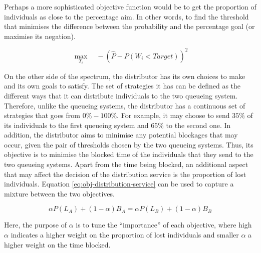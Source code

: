 Perhaps a more sophisticated objective function would be to get the proportion 
of individuals as close to the percentage aim. 
In other words, to find the threshold that minimises the difference between the 
probability and the percentage goal (or maximise its negation).

\begin{equation}
    \max_{T_i} \quad -\left( \hat{P} - P(W_i < \textit{Target}) \right)^2
\end{equation}


On the other side of the spectrum, the distributor has its own choices 
to make and its own goals to satisfy.
The set of strategies it has can be defined as the different ways that it can 
distribute individuals to the two queueing system.
Therefore, unlike the queueing systems, the distributor has a 
continuous set of strategies that goes from \( 0\% - 100\% \). 
For example, it may choose to send \(35\%\) of its individuals to the first 
queueing system and \(65\%\) to the second one.
In addition, the distributor aims to minimise any potential blockages
that may occur, given the pair of thresholds chosen by the two queueing systems.
Thus, its objective is to minimise the blocked time of the individuals 
that they send to the two queueing systems.
Apart from the time being blocked, an additional aspect that may affect the 
decision of the distribution service is the proportion of lost individuals.
Equation \ref{eq:obj-distribution-service} can be used to capture a mixture 
between the two objectives.

\begin{equation}\label{eq:obj-distribution-service}
    \alpha P(L_A) + (1 - \alpha) B_A = 
    \alpha P(L_B) + (1 - \alpha) B_B
\end{equation}

Here, the purpose of \(\alpha\) is to tune the ``importance'' of each objective,
where high \(\alpha\) indicates a higher weight on the proportion of lost 
individuals and smaller \(\alpha\) a higher weight on the time blocked. 



